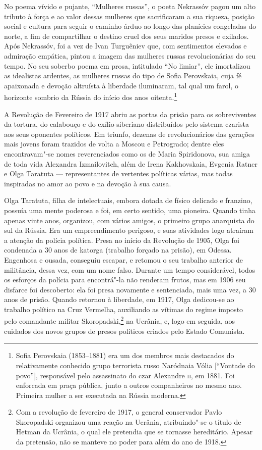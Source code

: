 No poema vívido e pujante, ``Mulheres russas'', o poeta Nekrassóv pagou
um alto tributo à força e ao valor dessas mulheres que sacrificaram a sua
riqueza, posição social e cultura para seguir o caminho árduo ao longo
das planícies congeladas do norte, a fim de compartilhar o destino cruel
dos seus maridos presos e exilados. Após Nekrassóv, foi a vez de Ivan
Turguêniev que, com sentimentos elevados e admiração empática, pintou a
imagem das mulheres russas revolucionárias do seu tempo. No seu soberbo
poema em prosa, intitulado ``No limiar'', ele imortalizou as idealistas
ardentes, as mulheres russas do tipo de Sofia Perovskaia, cuja fé
apaixonada e devoção altruísta à liberdade iluminaram, tal qual um
farol, o horizonte sombrio da Rússia do início dos anos
oitenta.\footnote{Sofia Perovskaia (1853--1881) era um dos membros mais
  destacados do relativamente conhecido grupo terrorista russo Naródnaia Vólia
  {[}``Vontade do povo''{]}, responsável pelo assassinato do czar
  Alexandre \textsc{ii}, em 1881. Foi enforcada em praça pública, junto a outros
  companheiros no mesmo ano. Primeira mulher a ser executada na
  Rússia moderna.}

A Revolução de Fevereiro de 1917 abriu as portas da prisão para os
sobreviventes da tortura, do calabouço e do exílio siberiano
distribuídos pelo sistema czarista aos seus oponentes políticos. Em
triunfo, dezenas de revolucionários das gerações mais jovens foram trazidos de volta a Moscou e Petrogrado;
dentre eles encontravam"-se
nomes reverenciados como os de Maria Spiridonova, sua amiga de toda vida
Alexandra Izmailovitch, além de Irena Kakhovskaia, Evgenia Ratner e Olga Taratuta
--- representantes de vertentes políticas várias, mas todas inspiradas no
amor ao povo e na devoção à sua causa.

Olga Taratuta, filha de intelectuais, embora dotada de físico delicado e franzino,
possuía uma mente poderosa e foi, em certo sentido, uma pioneira. Quando
tinha apenas vinte anos, organizou, com vários amigos, o primeiro grupo
anarquista do sul da Rússia. Era um empreendimento perigoso, e suas
atividades logo atraíram a atenção da polícia política. Presa no início
da Revolução de 1905, Olga foi condenada a 30 anos de katorga (trabalho
forçado na prisão), em Odessa. Engenhosa e ousada, conseguiu escapar, e
retomou o seu trabalho anterior de militância, dessa vez, com um nome falso. Durante
um tempo considerável, todos os esforços da polícia para encontrá"-la não
renderam frutos, mas em 1906 seu disfarce foi descoberto: ela foi presa
novamente e sentenciada, mais uma vez, a 30 anos de prisão. Quando
retornou à liberdade, em 1917, Olga dedicou-se ao trabalho político na
Cruz Vermelha, auxiliando as vítimas do regime imposto pelo comandante militar
Skoropadski,\footnote{Com a revolução de fevereiro de 1917, o general
  conservador Pavlo Skoropadski organizou uma reação na Ucrânia,
  atribuindo"-se o título de Hetman da Ucrânia, o qual ele pretendia que se tornasse
  hereditário. Apesar da pretensão, não se manteve no poder para além do ano de 1918.}
na Ucrânia, e, logo em seguida, aos cuidados dos novos grupos
de presos políticos criados pelo Estado Comunista.

